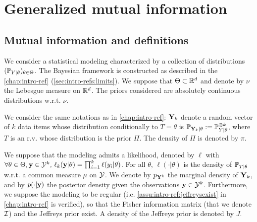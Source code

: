\section{Generalized mutual information}\label{sec:PSGSA:genMI}

\subsection{Mutual information and definitions}


We consider a statistical modeling characterized by a collection of distributions $(\mathbb{P}_{Y|\theta})_{\theta\in\Theta}$. 
The Bayesian framework is constructed as described in the \cref{chap:intro-ref} (\cref{sec:intro-refs:limits}). We suppose that $\Theta\subset\mathbb{R}^d$ and denote by $\nu$ the Lebesgue measure on $\mathbb{R}^d$. 
The priors considered are absolutely continuous distributions w.r.t. $\nu$.

We consider the same notations as in \cref{chap:intro-ref}: $\mathbf{Y}_k$ denote a random vector of $k$ data items whose distribution conditionally to $T=\theta$ is $\mathbb{P}_{\mathbf{Y}_k|\theta}:=\mathbb{P}_{Y|\theta}^{\otimes k}$, where $T$ is an r.v. whose distribution is the prior $\varPi$. The density of $\varPi$ is denoted by $\pi$.

We suppose that the modeling admits a likelihood, denoted by $\ell$ with $\forall\theta\in\Theta,\mathbf{y}\in\mathcal{Y}^k,\, \ell_k(\mathbf{y}|\theta)=\prod_{i=1}^k\ell(y_i|\theta) $. For all $\theta$, $\ell(\cdot|\theta)$ is the density of $\mathbb{P}_{T|\theta}$ w.r.t. a common measure $\mu$ on $\mathcal{Y}$. We denote by $p_{\mathbf{Y}^k}$ the marginal density of $\mathbf{Y}_k$, and by $p(\cdot|\mathbf{y})$ the posterior density given the observations $\mathbf{y}\in\mathcal{Y}^k$. %
Furthermore, we suppose the modeling to be regular (i.e. \cref{assu:intro-ref:jeffreysexist} in \cref{chap:intro-ref} is verified), so that the Fisher information matrix (that we denote $\mathcal{I}$) and the Jeffreys prior exist. A density of the Jeffreys prior is denoted by $J$.



